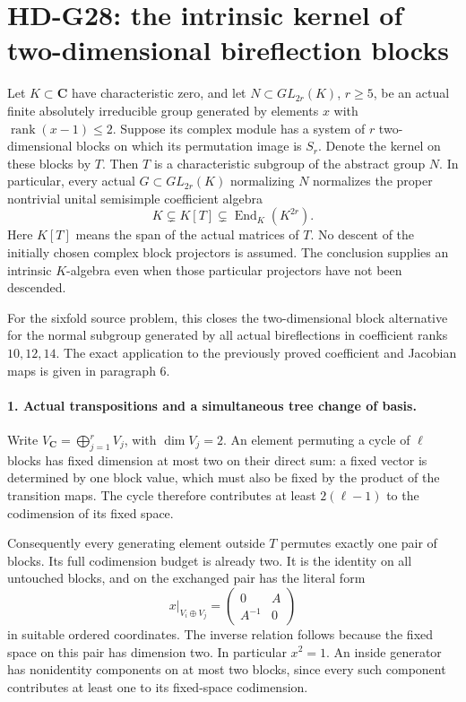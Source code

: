 \section{HD-G28: the intrinsic kernel of two-dimensional bireflection blocks}
\label{sec:two-block-kernel-scope}

Let \(K\subset\mathbf C\) have characteristic zero, and let
\(N\subset GL_{2r}(K)\), \(r\ge5\), be an actual finite
absolutely irreducible group generated by elements \(x\) with
\(\operatorname{rank}(x-1)\le2\). Suppose its complex module
has a system of \(r\) two-dimensional blocks on which its
permutation image is \(S_r\). Denote the kernel on these blocks
by \(T\). Then \(T\) is a characteristic subgroup of the
abstract group \(N\). In particular, every actual
\(G\subset GL_{2r}(K)\) normalizing \(N\) normalizes the
proper nontrivial unital semisimple coefficient algebra
\[
       K\subsetneq K[T]\subsetneq\operatorname{End}_K(K^{2r}).
                                                               \tag{G28.1}
\]
Here \(K[T]\) means the span of the actual matrices of \(T\).
No descent of the initially chosen complex block projectors is
assumed. The conclusion supplies an intrinsic \(K\)-algebra
even when those particular projectors have not been descended.

For the sixfold source problem, this closes the two-dimensional
block alternative for the normal subgroup generated by all
actual bireflections in coefficient ranks \(10,12,14\).
The exact application to the previously proved coefficient and
Jacobian maps is given in paragraph 6.

\paragraph{1. Actual transpositions and a simultaneous tree change of basis.}
Write \(V_{\mathbf C}=\bigoplus_{j=1}^rV_j\), with
\(\dim V_j=2\). An element permuting a cycle of \(\ell\)
blocks has fixed dimension at most two on their direct sum:
a fixed vector is determined by one block value, which must
also be fixed by the product of the transition maps.
The cycle therefore contributes at least \(2(\ell-1)\)
to the codimension of its fixed space.

Consequently every generating element outside \(T\) permutes
exactly one pair of blocks. Its full codimension budget is
already two. It is the identity on all untouched blocks, and
on the exchanged pair has the literal form
\[
       x|_{V_i\oplus V_j}
          =\begin{pmatrix}0&A\\A^{-1}&0\end{pmatrix}
                                                               \tag{G28.2}
\]
in suitable ordered coordinates. The inverse relation follows
because the fixed space on this pair has dimension two.
In particular \(x^2=1\). An inside generator has nonidentity
components on at most two blocks, since every such component
contributes at least one to its fixed-space codimension.

